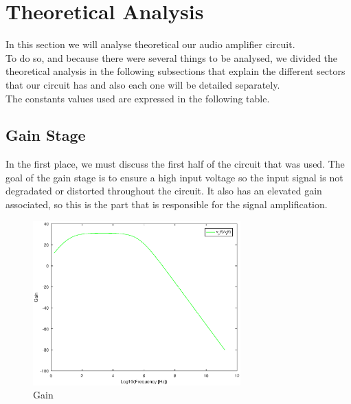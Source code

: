 \section{Theoretical Analysis}
\label{sec:analysis}

In this section we will analyse theoretical our audio amplifier circuit. \\
To do so, and because there were several things to be analysed, we divided the theoretical analysis in the following subsections that explain the different sectors that our circuit has and also each one will be detailed separately.\\

The constants values used are expressed in the following table.

%

\subsection{Gain Stage}

In the first place, we must discuss the first half of the circuit that was used. The goal of the gain stage is to ensure a high input voltage so the input signal is not degradated or distorted throughout the circuit. It also has an elevated gain associated, so this is the part that is responsible for the signal amplification.

\begin{figure}[H] 
\centering
\includegraphics[width = 8cm]{Gain.eps} 
\caption{Gain}
\label{gain}
\end{figure}

